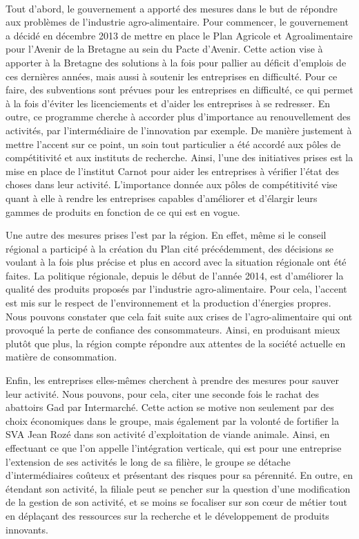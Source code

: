 \documentclass[a4paper,10pt]{report}
\begin{document}
			\paragraph{}Tout d’abord, le gouvernement a apporté des mesures dans le but de répondre aux problèmes de l’industrie agro-alimentaire. Pour commencer, le gouvernement a décidé en décembre 2013 de mettre en place le Plan Agricole et Agroalimentaire pour l’Avenir de la Bretagne au sein du Pacte d’Avenir. Cette action vise à apporter à la Bretagne des solutions à la fois pour pallier au déficit d’emplois de ces dernières années, mais aussi à soutenir les entreprises en difficulté. Pour ce faire, des subventions sont prévues pour les entreprises en difficulté, ce qui permet à la fois d’éviter les licenciements et d’aider les entreprises à se redresser. En outre, ce programme cherche à accorder plus d’importance au renouvellement des activités, par l’intermédiaire de l’innovation par exemple. De manière justement à mettre l’accent sur ce point, un soin tout particulier a été accordé aux pôles de compétitivité et aux instituts de recherche. Ainsi, l'une des initiatives prises est la mise en place de l’institut Carnot pour aider les entreprises à vérifier l’état des choses dans leur activité. L’importance donnée aux pôles de compétitivité vise quant à elle à rendre les entreprises capables d’améliorer et d’élargir leurs gammes de produits en fonction de ce qui est en vogue.

			Une autre des mesures prises l’est par la région. En effet, même si le conseil régional a participé à la création du Plan cité précédemment, des décisions se voulant à la fois plus précise et plus en accord avec la situation régionale ont été faites. La politique régionale, depuis le début de l’année 2014, est d’améliorer la qualité des produits proposés par l’industrie agro-alimentaire. Pour cela, l’accent est mis sur le respect de l’environnement et la production d’énergies propres. Nous pouvons constater que cela fait suite aux crises de l’agro-alimentaire qui ont provoqué la perte de confiance des consommateurs. Ainsi, en produisant mieux plutôt que plus, la région compte répondre aux attentes de la société actuelle en matière de consommation.

			Enfin, les entreprises elles-mêmes cherchent à prendre des mesures pour sauver leur activité. Nous pouvons, pour cela, citer une seconde fois le rachat des abattoirs Gad par Intermarché. Cette action se motive non seulement par des choix économiques dans le groupe, mais également par la volonté de fortifier la SVA Jean Rozé dans son activité d’exploitation de viande animale. Ainsi, en effectuant ce que l’on appelle l’intégration verticale, qui est pour une entreprise l’extension de ses activités le long de sa filière, le groupe se détache d’intermédiaires coûteux et présentant des risques pour sa pérennité. En outre, en étendant son activité, la filiale peut se pencher sur la question d’une modification de la gestion de son activité, et se moins se focaliser sur son cœur de métier tout en déplaçant des ressources sur la recherche et le développement de produits innovants.
\end{document}
